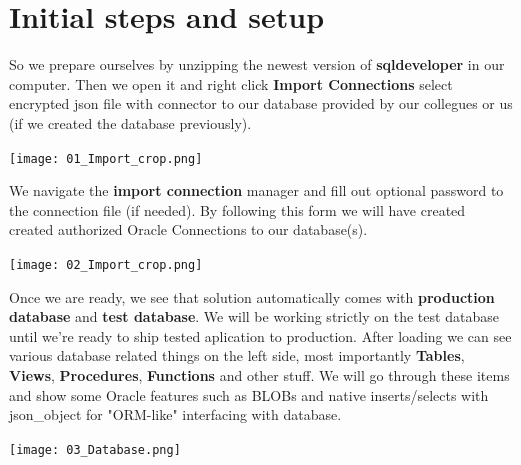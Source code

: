 \documentclass{article}
\begin{document}
\section{Initial steps and setup}
So we prepare ourselves by unzipping the newest version of \textbf{sqldeveloper} in our computer. Then we open it and right click \textbf{Import Connections} select encrypted json file with connector to our database provided by our collegues or us (if we created the database previously).  \par
\begin{center}
\texttt{[image: 01\_Import\_crop.png]}
\end{center}
We navigate the \textbf{import connection} manager and fill out optional password to the connection file (if needed). By following this form we will have created created authorized Oracle Connections to our database(s). \par
\begin{center}
  \texttt{[image: 02\_Import\_crop.png]}
\end{center}
Once we are ready, we see that solution automatically comes with \textbf{production database} and \textbf{test database}. We will be working strictly on the test database until we're ready to ship tested aplication to production. After loading we can see various database related things on the left side, most importantly \textbf{Tables}, \textbf{Views}, \textbf{Procedures}, \textbf{Functions} and other stuff. We will go through these items and show some Oracle features such as BLOBs and native inserts/selects with json\_object for "ORM-like" interfacing with database. \par
\begin{center}
  \texttt{[image: 03\_Database.png]}
\end{center}
\end{document}
